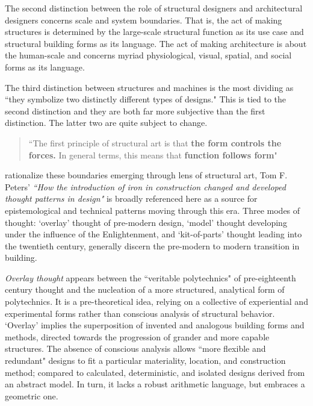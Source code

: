 The second distinction between the role of structural designers and architectural designers concerns scale and system boundaries. That is, the act of making structures is determined by the large-scale structural function as its use case and structural building forms as its language. The act of making architecture is about the human-scale and concerns myriad physiological, visual, spatial, and social forms as its language.

The third distinction between structures and machines is the most dividing as ``they symbolize two distinctly different types of designs." This is tied to the second distinction and they are both far more subjective than the first distinction. The latter two are quite subject to change.

\begin{quote}
  ``The first principle of structural art is that {\large{\textbf{the form controls the forces.}}} In general terms, this means that {\large{\textbf{function follows form}}}" \cite[p87]{TOWERANDBRIDGE}
\end{quote}

rationalize these boundaries emerging through lens of structural art, Tom F. Peters' \textit{``How the introduction of iron in construction changed and developed thought patterns in design"} is broadly referenced here as a source for epistemological and technical patterns moving through this era. Three modes of thought: `overlay' thought \cite[36]{IRON} of pre-modern design, `model' thought \cite[37]{IRON} developing under the influence of the Enlightenment, and `kit-of-parts' thought \cite[53]{IRON} leading into the twentieth century, generally discern the pre-modern to modern transition in building.

\textit{Overlay thought} appears between the ``veritable polytechnics" of pre-eighteenth century thought and the nucleation of a more structured, analytical form of polytechnics. It is a pre-theoretical idea, relying on a collective of experiential and experimental forms rather than conscious analysis of structural behavior. `Overlay' implies the superposition of invented and analogous building forms and methods, directed towards the progression of grander and more capable structures. The absence of conscious analysis allows ``more flexible and redundant" designs to fit a particular materiality, location, and construction method; compared to calculated, deterministic, and isolated designs derived from an abstract model. \cite[p36, 37]{IRON} In turn, it lacks a robust arithmetic language, but embraces a geometric one.

